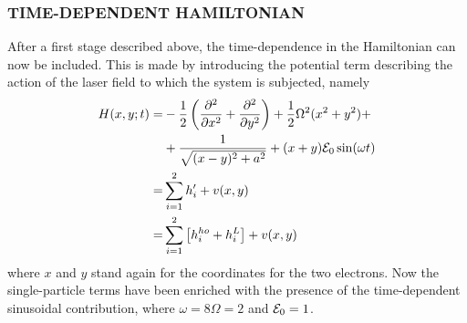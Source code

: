 \subsubsection{TIME-DEPENDENT HAMILTONIAN}
After a first stage described above, the time-dependence in the Hamiltonian can now be included. This is made by introducing the potential term describing the action of the laser field to which the system is subjected, namely
\begin{align}
\begin{split}
    H(x,y; t) =& -\frac{1}{2} \left( \frac{\partial^2}{\partial x^2} + \frac{\partial^2}{\partial y^2} \right) + \frac{1}{2} \Omega^2 (x^2 + y^2) + \\
    &+ \frac{1}{\sqrt{(x-y)^2 + a^2}} + (x+y) \mathcal{E}_0 \sin (\omega t) \\
    =& \sum_{i=1}^2 h_i' + v(x,y) \\
    =& \sum_{i=1}^2 \left[ h_i^{ho} + h_{i}^{L} \right]+ v(x,y)
\end{split}
\label{eq:hamiltonian_t_dip}
\end{align}
where $x$ and $y$ stand again for the coordinates for the two electrons. Now the single-particle terms have been enriched with the presence of the time-dependent sinusoidal contribution, where $\omega=8 \Omega = 2$ and $\mathcal{E}_0 = 1$.


